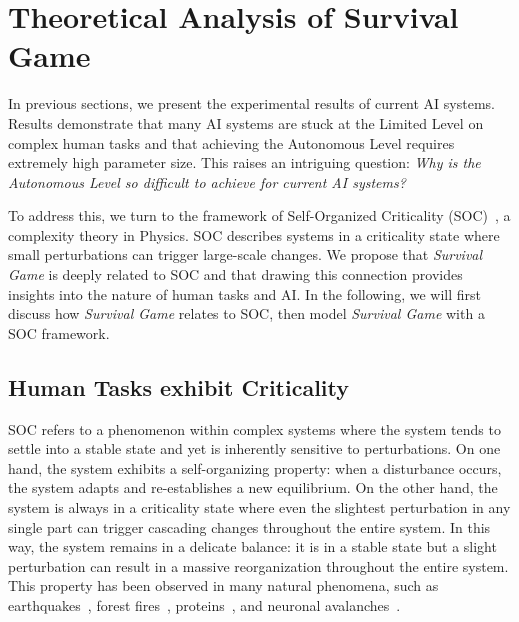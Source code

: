 \section{Theoretical Analysis of Survival Game}
\label{sec:theory}

In previous sections, we present the experimental results of current AI systems. Results demonstrate that many AI systems are stuck at the Limited Level on complex human tasks and that achieving the Autonomous Level requires extremely high parameter size. This raises an intriguing question: \textit{Why is the Autonomous Level so difficult to achieve for current AI systems?}

To address this, we turn to the framework of Self-Organized Criticality (SOC)~\citep{PhysRevLett.59.381}, a complexity theory in Physics. SOC describes systems in a criticality state where small perturbations can trigger large-scale changes. We propose that \textit{Survival Game} is deeply related to SOC and that drawing this connection provides insights into the nature of human tasks and AI. In the following, we will first discuss how \textit{Survival Game} relates to SOC, then model \textit{Survival Game} with a SOC framework.



\subsection{Human Tasks exhibit Criticality}


SOC refers to a phenomenon within complex systems where the system tends to settle into a stable state and yet is inherently sensitive to perturbations. On one hand, the system exhibits a self-organizing property: when a disturbance occurs, the system adapts and re-establishes a new equilibrium. On the other hand, the system is always in a criticality state where even the slightest perturbation in any single part can trigger cascading changes throughout the entire system. In this way, the system remains in a delicate balance: it is in a stable state but a slight perturbation can result in a massive reorganization throughout the entire system.
This property has been observed in many natural phenomena, such as earthquakes~\citep{turcotte1985collapse}, forest fires~\citep{malamud1998forest}, proteins~\citep{phillips2014fractals}, and neuronal avalanches~\citep{chialvo2010emergent}. 

